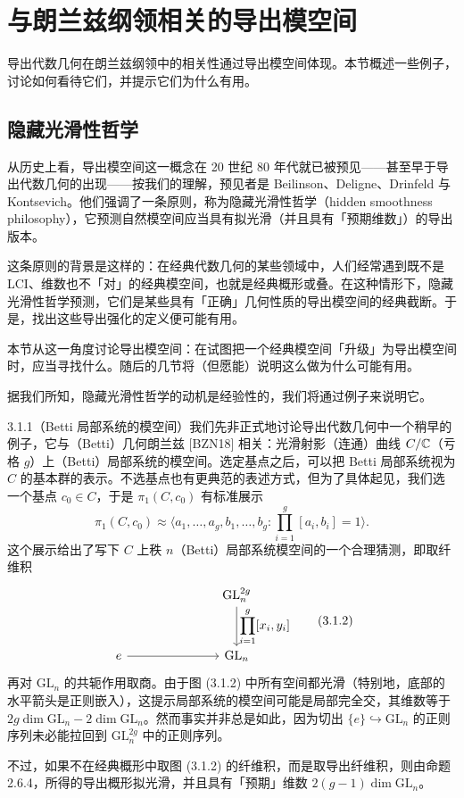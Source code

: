 \section{与朗兰兹纲领相关的导出模空间}

导出代数几何在朗兰兹纲领中的相关性通过导出模空间体现。本节概述一些例子，讨论如何看待它们，并提示它们为什么有用。

\subsection{隐藏光滑性哲学}

从历史上看，导出模空间这一概念在 20 世纪 80 年代就已被预见——甚至早于导出代数几何的出现——按我们的理解，预见者是 Beilinson、Deligne、Drinfeld 与 Kontsevich。他们强调了一条原则，称为隐藏光滑性哲学（hidden smoothness philosophy），它预测自然模空间应当具有拟光滑（并且具有「预期维数」）的导出版本。

这条原则的背景是这样的：在经典代数几何的某些领域中，人们经常遇到既不是 LCI、维数也不「对」的经典模空间，也就是经典概形或叠。在这种情形下，隐藏光滑性哲学预测，它们是某些具有「正确」几何性质的导出模空间的经典截断。于是，找出这些导出强化的定义便可能有用。

本节从这一角度讨论导出模空间：在试图把一个经典模空间「升级」为导出模空间时，应当寻找什么。随后的几节将（但愿能）说明这么做为什么可能有用。

据我们所知，隐藏光滑性哲学的动机是经验性的，我们将通过例子来说明它。

\begin{exam}{3.1.1}（Betti 局部系统的模空间）我们先非正式地讨论导出代数几何中一个稍早的例子，它与（Betti）几何朗兰兹 [BZN18] 相关：光滑射影（连通）曲线 $C/\mathbb{C}$（亏格 $g$）上（Betti）局部系统的模空间。选定基点之后，可以把 Betti 局部系统视为 $C$ 的基本群的表示。不选基点也有更典范的表述方式，但为了具体起见，我们选一个基点 $c_0\in C$，于是 $\pi_1(C,c_0)$ 有标准展示
\begin{equation}
\pi_1(C,c_0)\approx\langle a_1,\dots,a_g,b_1,\dots,b_g:\prod_{i=1}^{g}[a_i,b_i]=1\rangle.
\tag{3.1.1}\label{eq:a6-02-3-1-1}
\end{equation}
这个展示给出了写下 $C$ 上秩 $n$（Betti）局部系统模空间的一个合理猜测，即取纤维积
\begin{equation}
\begin{tikzcd}[column sep=large, row sep=3.2em]
& & \mathrm{GL}_n^{2g} \arrow[d, "{\displaystyle\prod_{i=1}^{g}[x_i,y_i]}"] \\
e \arrow[rr] & & \mathrm{GL}_n
\end{tikzcd}
\tag{3.1.2}\label{eq:a6-02-3-1-2}
\end{equation}
再对 $\mathrm{GL}_n$ 的共轭作用取商。由于图 (3.1.2) 中所有空间都光滑（特别地，底部的水平箭头是正则嵌入），这提示局部系统的模空间可能是局部完全交，其维数等于 $2g\dim\mathrm{GL}_n-2\dim\mathrm{GL}_n$。然而事实并非总是如此，因为切出 $\{e\}\hookrightarrow\mathrm{GL}_n$ 的正则序列未必能拉回到 $\mathrm{GL}_n^{2g}$ 中的正则序列。

不过，如果不在经典概形中取图 (3.1.2) 的纤维积，而是取导出纤维积，则由命题 2.6.4，所得的导出概形拟光滑，并且具有「预期」维数 $2(g-1)\dim\mathrm{GL}_n$。
\end{exam}

